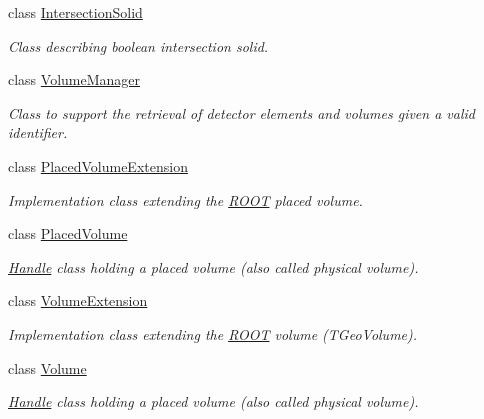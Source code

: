 \begin{DoxyCompactItemize}
class \hyperlink{class_d_d4hep_1_1_geometry_1_1_intersection_solid}{IntersectionSolid}
\begin{DoxyCompactList}\small\item\em Class describing boolean intersection solid. \item\end{DoxyCompactList}\item 
class \hyperlink{class_d_d4hep_1_1_geometry_1_1_volume_manager}{VolumeManager}
\begin{DoxyCompactList}\small\item\em Class to support the retrieval of detector elements and volumes given a valid identifier. \item\end{DoxyCompactList}\item 
class \hyperlink{class_d_d4hep_1_1_geometry_1_1_placed_volume_extension}{PlacedVolumeExtension}
\begin{DoxyCompactList}\small\item\em Implementation class extending the \hyperlink{namespace_r_o_o_t}{ROOT} placed volume. \item\end{DoxyCompactList}\item 
class \hyperlink{class_d_d4hep_1_1_geometry_1_1_placed_volume}{PlacedVolume}
\begin{DoxyCompactList}\small\item\em \hyperlink{class_d_d4hep_1_1_handle}{Handle} class holding a placed volume (also called physical volume). \item\end{DoxyCompactList}\item 
class \hyperlink{class_d_d4hep_1_1_geometry_1_1_volume_extension}{VolumeExtension}
\begin{DoxyCompactList}\small\item\em Implementation class extending the \hyperlink{namespace_r_o_o_t}{ROOT} volume (TGeoVolume). \item\end{DoxyCompactList}\item 
class \hyperlink{class_d_d4hep_1_1_geometry_1_1_volume}{Volume}
\begin{DoxyCompactList}\small\item\em \hyperlink{class_d_d4hep_1_1_handle}{Handle} class holding a placed volume (also called physical volume). \item\end{DoxyCompactList}\item 

\end{DoxyCompactItemize}
